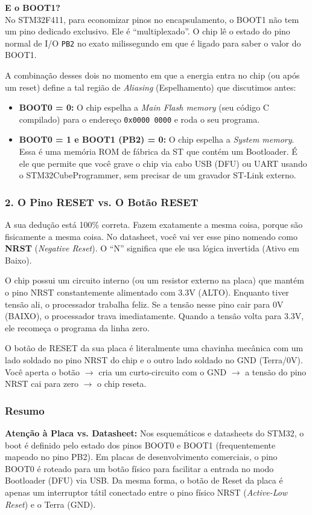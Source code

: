 \documentclass[12pt,a4paper]{article}
\begin{document}
\textbf{E o BOOT1?}\\
No STM32F411, para economizar pinos no encapsulamento, o BOOT1 não tem um pino dedicado exclusivo. Ele é ``multiplexado''. O chip lê o estado do pino normal de I/O \texttt{PB2} no exato milissegundo em que é ligado para saber o valor do BOOT1.

A combinação desses dois no momento em que a energia entra no chip (ou após um reset) define a tal região de \textit{Aliasing} (Espelhamento) que discutimos antes:
\begin{itemize}
    \item \textbf{BOOT0 = 0:} O chip espelha a \textit{Main Flash memory} (seu código C compilado) para o endereço \texttt{0x0000 0000} e roda o seu programa.
    \item \textbf{BOOT0 = 1 e BOOT1 (PB2) = 0:} O chip espelha a \textit{System memory}. Essa é uma memória ROM de fábrica da ST que contém um Bootloader. É ele que permite que você grave o chip via cabo USB (DFU) ou UART usando o STM32CubeProgrammer, sem precisar de um gravador ST-Link externo.
\end{itemize}

\subsubsection*{2. O Pino RESET vs. O Botão RESET}
A sua dedução está 100\% correta. Fazem exatamente a mesma coisa, porque são fisicamente a mesma coisa.
No datasheet, você vai ver esse pino nomeado como \textbf{NRST} (\textit{Negative Reset}). O ``N'' significa que ele usa lógica invertida (Ativo em Baixo).

O chip possui um circuito interno (ou um resistor externo na placa) que mantém o pino NRST constantemente alimentado com 3.3V (ALTO). Enquanto tiver tensão ali, o processador trabalha feliz. Se a tensão nesse pino cair para 0V (BAIXO), o processador trava imediatamente. Quando a tensão volta para 3.3V, ele recomeça o programa da linha zero.

O botão de RESET da sua placa é literalmente uma chavinha mecânica com um lado soldado no pino NRST do chip e o outro lado soldado no GND (Terra/0V). Você aperta o botão $\rightarrow$ cria um curto-circuito com o GND $\rightarrow$ a tensão do pino NRST cai para zero $\rightarrow$ o chip reseta.

\subsubsection*{Resumo}
\textbf{Atenção à Placa vs. Datasheet:} Nos esquemáticos e datasheets do STM32, o boot é definido pelo estado dos pinos BOOT0 e BOOT1 (frequentemente mapeado no pino PB2). Em placas de desenvolvimento comerciais, o pino BOOT0 é roteado para um botão físico para facilitar a entrada no modo Bootloader (DFU) via USB. Da mesma forma, o botão de Reset da placa é apenas um interruptor tátil conectado entre o pino físico NRST (\textit{Active-Low Reset}) e o Terra (GND).
\end{document}
